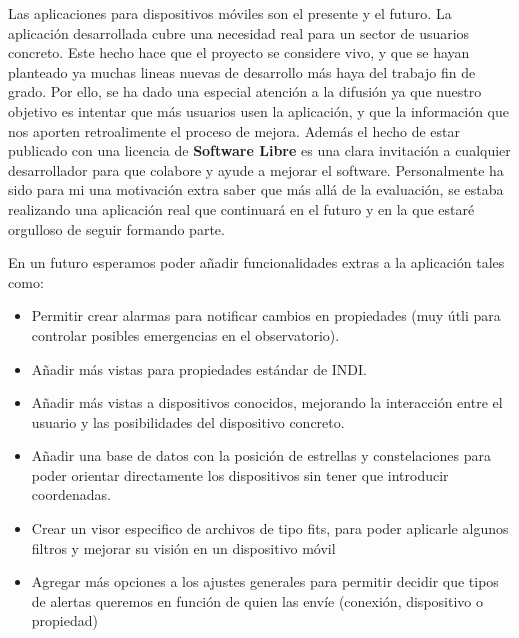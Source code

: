 \bigskip
Las aplicaciones para dispositivos móviles son el presente y el futuro. La aplicación desarrollada cubre una necesidad real para un sector de usuarios concreto. Este hecho hace que el proyecto se considere vivo, y que se hayan planteado ya muchas lineas nuevas de desarrollo más haya del trabajo fin de grado. Por ello, se ha dado una especial atención a la difusión ya que nuestro objetivo es intentar que más usuarios usen la aplicación, y que la información que nos aporten retroalimente el proceso de mejora. Además el hecho de estar publicado con una licencia de \textbf{Software Libre} es una clara invitación a cualquier desarrollador para que colabore y ayude a mejorar el software. Personalmente ha sido para mi una motivación extra saber que más allá de la evaluación, se estaba realizando una aplicación real que continuará en el futuro y en la que estaré orgulloso de seguir formando parte.

\bigskip
En un futuro esperamos poder añadir funcionalidades extras a la aplicación tales como:

\begin{itemize}
  \item Permitir crear alarmas para notificar cambios en propiedades (muy útli para controlar posibles emergencias en el observatorio).
  \item Añadir más vistas para propiedades estándar de INDI.
  \item Añadir más vistas a dispositivos conocidos, mejorando la interacción entre el usuario y las posibilidades del dispositivo concreto.
  \item Añadir una base de datos con la posición de estrellas y constelaciones para poder orientar directamente los dispositivos sin tener que introducir coordenadas.
  \item Crear un visor especifico de archivos de tipo fits, para poder aplicarle algunos filtros y mejorar su visión en un dispositivo móvil
  \item Agregar más opciones a los ajustes generales para permitir decidir que tipos de alertas queremos en función de quien las envíe (conexión, dispositivo o propiedad)
\end{itemize}

